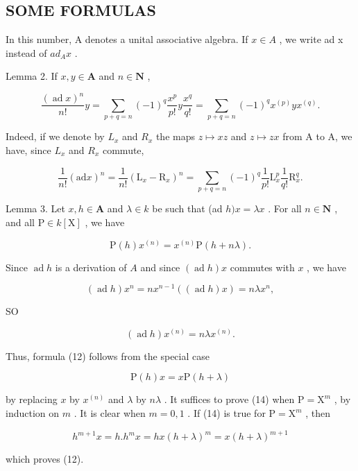 \subsection{SOME FORMULAS}

In this number, A denotes a unital associative algebra. If \(x \in A\) , we write ad x instead of \(ad_{A}x\) .

Lemma 2. If \(x, y \in \mathbf{A}\) and \(n \in \mathbf{N}\) ,

\[
\frac {(\operatorname{ad} x) ^ {n}}{n !} y = \sum_ {p + q = n} (- 1) ^ {q} \frac {x ^ {p}}{p !} y \frac {x ^ {q}}{q !} = \sum_ {p + q = n} (- 1) ^ {q} x ^ {(p)} y x ^ {(q)}.\tag{11}
\]

Indeed, if we denote by \(L_{x}\) and \(R_{x}\) the maps \(z \mapsto xz\) and \(z \mapsto zx\) from A to A, we have, since \(L_{x}\) and \(R_{x}\) commute,

\[
\frac {1}{n !} (\mathrm{ad} x) ^ {n} = \frac {1}{n !} (\mathrm{L} _ {x} - \mathrm{R} _ {x}) ^ {n} = \sum_ {p + q = n} (- 1) ^ {q} \frac {1}{p !} \mathrm{L} _ {x} ^ {p} \frac {1}{q !} \mathrm{R} _ {x} ^ {q}.
\]

Lemma 3. Let \(x, h \in \mathbf{A}\) and \(\lambda \in k\) be such that (ad \(h)x = \lambda x\) . For all \(n \in \mathbf{N}\) , and all \(\mathrm{P} \in k[\mathrm{X}]\) , we have

\[
\mathrm{P} (h) x ^ {(n)} = x ^ {(n)} \mathrm{P} (h + n \lambda).\tag{12}
\]

Since \(\operatorname{ad} h\) is a derivation of \(A\) and since \((\operatorname{ad} h)x\) commutes with \(x\) , we have

\[
(\operatorname{ad} h) x ^ {n} = n x ^ {n - 1} ((\operatorname{ad} h) x) = n \lambda x ^ {n},\tag{13}
\]

SO

\[
(\operatorname{ad} h) x ^ {(n)} = n \lambda x ^ {(n)}.
\]

Thus, formula (12) follows from the special case

\[
\mathrm{P} (h) x = x \mathrm{P} (h + \lambda)\tag{14}
\]

by replacing \(x\) by \(x^{(n)}\) and \(\lambda\) by \(n\lambda\) . It suffices to prove (14) when \(\mathrm{P} = \mathrm{X}^m\) , by induction on \(m\) . It is clear when \(m = 0, 1\) . If (14) is true for \(\mathrm{P} = \mathrm{X}^m\) , then

\[
h ^ {m + 1} x = h. h ^ {m} x = h x (h + \lambda) ^ {m} = x (h + \lambda) ^ {m + 1}
\]

which proves (12).

